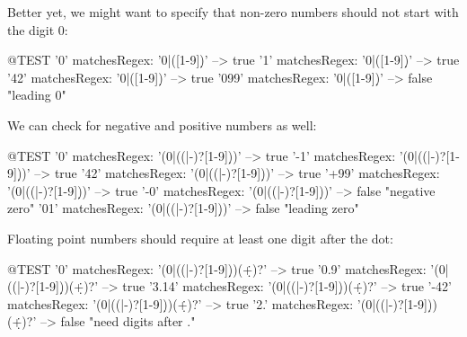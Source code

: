 \documentclass[10pt,twoside,chapterprefix=false]{scrbook}
\begin{document}
{Better yet, we might want to specify that non-zero numbers should not start with the digit 0:

\begin{ToSh-code}{@TEST}
'0' matchesRegex: '0|([1-9]\d*)'     --> true
'1' matchesRegex: '0|([1-9]\d*)'     --> true
'42' matchesRegex: '0|([1-9]\d*)'   --> true
'099' matchesRegex: '0|([1-9]\d*)' --> false    "leading 0"
\end{ToSh-code}

We can check for negative and positive numbers as well:

\begin{ToSh-code}{@TEST}
'0' matchesRegex: '(0|((\+|-)?[1-9]\d*))'     --> true
'-1' matchesRegex: '(0|((\+|-)?[1-9]\d*))'   --> true
'42' matchesRegex: '(0|((\+|-)?[1-9]\d*))'   --> true
'+99' matchesRegex: '(0|((\+|-)?[1-9]\d*))' --> true
'-0' matchesRegex: '(0|((\+|-)?[1-9]\d*))'   --> false    "negative zero"
'01' matchesRegex: '(0|((\+|-)?[1-9]\d*))'   --> false    "leading zero"
\end{ToSh-code}

Floating point numbers should require at least one digit after the dot:

\begin{ToSh-code}{@TEST}
'0' matchesRegex: '(0|((\+|-)?[1-9]\d*))(\.\d+)?'      --> true
'0.9' matchesRegex: '(0|((\+|-)?[1-9]\d*))(\.\d+)?'   --> true
'3.14' matchesRegex: '(0|((\+|-)?[1-9]\d*))(\.\d+)?' --> true
'-42' matchesRegex: '(0|((\+|-)?[1-9]\d*))(\.\d+)?'  --> true
'2.' matchesRegex: '(0|((\+|-)?[1-9]\d*))(\.\d+)?'     --> false    "need digits after ."
\end{ToSh-code}


}
\end{document}
